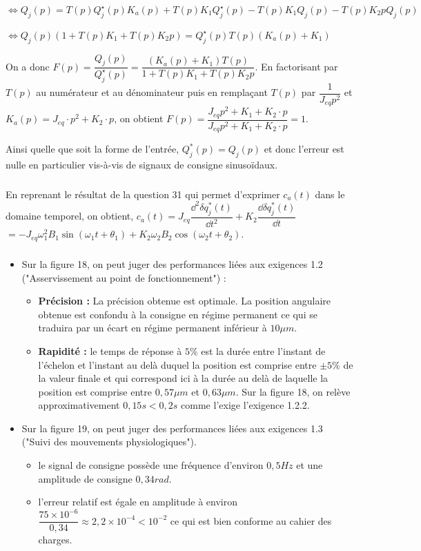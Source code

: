 \documentclass[10pt,fleqn]{article} %
\begin{document}
$\Leftrightarrow Q_j(p) = 
    T(p)Q_j^{\star}(p) K_a(p) + 
        T(p)K_1 Q_j^{\star}(p) -T(p)K_1  Q_j(p)   - T(p)K_2 p Q_j(p) 
     $

$\Leftrightarrow Q_j(p)\left(1     +T(p)K_1     + T(p)K_2 p\right)= 
      Q_j^{\star}(p)T(p) \left(  K_a(p)     +K_1 \right)     $

On a donc $F(p)=\dfrac{Q_j(p)}{Q_j^{\star}(p)}=\dfrac{\left(K_a(p) +K_1\right)T(p)}{1+T(p)K_1 + T(p)K_2 p}$.
En factorisant par $T(p)$ au numérateur et au dénominateur puis en remplaçant $T(p)$ par $\dfrac{1}{J_{eq}p^2}$ et $K_a(p)=J_{eq}\cdot p^2+K_2\cdot p$, on obtient $
F(p)=\dfrac{J_{eq}p^2+K_1+K_2\cdot p}{J_{eq}p^2+K_1+K_2\cdot p}=1
$.

Ainsi quelle que soit la forme de l'entrée, $Q^*_j(p)=Q_j(p)$ et donc l'erreur est nulle en particulier vis-à-vis de signaux de consigne sinusoïdaux.

\subparagraph{}\textit{}%

En reprenant le résultat de la question 31 qui permet d'exprimer $c_a(t)$ dans le domaine temporel, on obtient, $
c_a(t)=J_{eq}\dfrac{\dd ^2\delta q^*_j(t)}{\dd t^2}+K_{2}\dfrac{\dd \delta q^*_j(t)}{\dd t}$
$=-J_{eq}\omega_1^2B_1\sin\left(\omega_1t+\theta_1\right)+K_2\omega_2B_2\cos\left(\omega_2t+\theta_2\right)
$.

\subparagraph{}\textit{}%



\begin{itemize}
\item Sur la figure 18, on peut juger des performances liées aux exigences 1.2 ("Asservissement au point de fonctionnement") :
\begin{itemize}
\item \textbf{Précision :} La précision obtenue est optimale. La position angulaire obtenue est confondu à la consigne en régime permanent ce qui se traduira par un écart en régime permanent inférieur à $10\mu m$.
\item \textbf{Rapidité : } le temps de réponse à $5\%$ est la durée entre l'instant de l'échelon et l'instant au delà duquel la position est comprise entre $\pm 5\%$ de la valeur finale et qui correspond ici à la durée au delà de laquelle la position est comprise entre $0,57\mu m$ et $0,63\mu m$. Sur la figure 18, on relève approximativement $0,15s<0,2s$ comme l'exige l'exigence 1.2.2.  
\end{itemize}
\item Sur la figure 19, on peut juger des performances liées aux exigences 1.3 ("Suivi des mouvements physiologiques"). 
\begin{itemize}
\item le signal de consigne possède une fréquence d'environ $0,5Hz$ et une amplitude de consigne $0,34rad$. 
\item l'erreur relatif est égale en amplitude à environ $\dfrac{75\times 10^{-6}}{0,34}\approx 2,2\times 10^{-4}<10^{-2}$ ce qui est bien conforme au cahier des charges.
\end{itemize}
\end{itemize}
\end{document}
